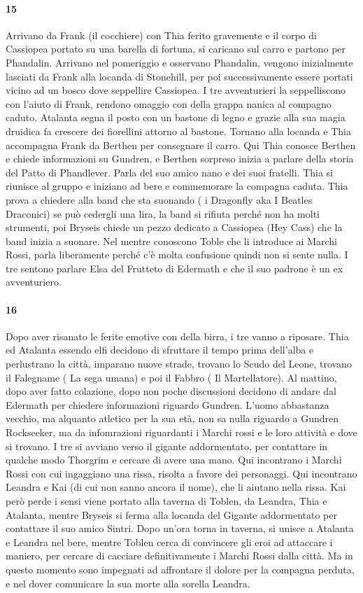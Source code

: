 \documentclass{article}
\begin{document}
                      \paragraph{15}
    Arrivano da Frank (il cocchiere) con Thia ferito gravemente e il corpo di Cassiopea portato su una barella di fortuna, si caricano sul carro e partono per Phandalin. Arrivano nel pomeriggio e osservano Phandalin, vengono inizialmente lasciati da Frank alla locanda di Stonehill, per poi successivamente essere portati vicino ad un bosco dove seppellire Cassiopea. I tre avventurieri la seppelliscono con l'aiuto di Frank, rendono omaggio con della grappa nanica al compagno caduto. Atalanta segna il posto con un bastone di legno e grazie alla sua magia druidica fa crescere dei fiorellini attorno al bastone. Tornano alla locanda e Thia accompagna Frank da Berthen per consegnare il carro. Qui Thia conosce Berthen e chiede informazioni su Gundren, e Berthen sorpreso inizia a parlare della storia del Patto di Phandlever. Parla del suo amico nano e dei suoi fratelli. Thia si riunisce al gruppo e iniziano ad bere e commemorare la compagna caduta. Thia prova a chiedere alla band che sta suonando ( i Dragonfly aka I Beatles Draconici) se può cedergli una lira, la band si rifiuta perché non ha molti strumenti, poi Bryseis chiede un pezzo dedicato a Cassiopea (Hey Cass) che la band inizia a suonare. Nel mentre conoscono Toble che li introduce ai Marchi Rossi, parla liberamente perché c'è molta confusione quindi non si sente nulla. I tre sentono parlare Elsa del Frutteto di Edermath e che il suo padrone è un ex avventuriero. 
                      \paragraph{16}
    Dopo aver risanato le ferite emotive con della birra, i tre vanno a riposare. Thia ed Atalanta essendo elfi decidono di sfruttare il tempo prima dell'alba e perlustrano la città, imparano nuove strade, trovano lo Scudo del Leone, trovano il Falegname ( La sega umana)  e poi il Fabbro ( Il Martellatore). Al mattino, dopo aver fatto colazione, dopo non poche discussioni decidono di andare dal Edermath per chiedere informazioni riguardo Gundren. L'uomo abbastanza vecchio, ma alquanto atletico per la sua età,  non sa nulla riguardo a  Gundren Rockseeker, ma da infomrazioni riguardanti i Marchi rossi e le loro attività e dove si trovano. I tre si avviano verso il gigante addormentato, per contattare in qualche modo Thorgrim e cercare di avere una mano. Qui incontrano i Marchi Rossi con cui ingaggiano una rissa, risolta a favore dei personaggi. Qui incontrano Leandra e Kai (di cui non sanno ancora il nome), che li aiutano nella rissa. Kai però perde  i sensi viene portato alla taverna di Toblen, da Leandra, Thia e Atalanta, mentre Bryseis si ferma alla locanda del Gigante addormentato per contattare il suo amico Sintri.  Dopo un'ora torna in taverna, si unisce a Atalanta e Leandra nel bere, mentre Toblen cerca di convincere gli eroi ad attaccare i maniero, per cercare di cacciare definitivamente i Marchi Rossi dalla città. Ma in questo momento sono impegnati ad affrontare il dolore per la compagna perduta, e nel dover comunicare la sua morte alla sorella Leandra.
   
\end{document}
